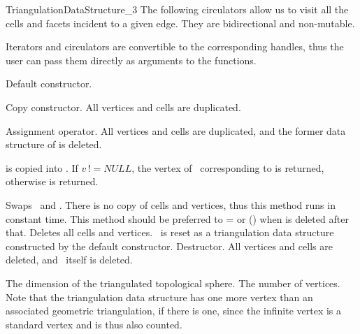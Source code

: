 \begin{ccRefConcept}{TriangulationDataStructure_3}
The following circulators allow us to visit all the cells and facets
incident to a given edge. They are bidirectional and non-mutable.

\ccGlue
{}

Iterators and circulators are convertible to the corresponding handles, thus
the user can pass them directly as arguments to the functions.

\ccCreation
{}  %
\ccThreeToTwo

{Default constructor.}

{Copy constructor. All vertices and cells are duplicated.}

{Assignment operator. All vertices and cells are duplicated, and the former
data structure of  is deleted.}


{ is copied into \ccVar. If $v\, !\!= NULL$, the vertex of \ccVar\ 
corresponding to  is returned, otherwise  is returned.
\ccPrecond{The optional argument \ccc{v} is a vertex of .}}

{Swaps \ccVar\ and . There is no copy of cells and vertices,
thus this method runs in constant time. This method should be preferred to
\ccVar= or \ccVar(\ccc{tds1}) when \ccc{tds1} is deleted after
that.}
\ccGlue
{}
{Deletes all cells and vertices. \ccVar\ is reset as a triangulation
data structure constructed by the default constructor.}
\ccGlue
{}
{Destructor. All vertices and cells are deleted, and \ccVar\ itself is
deleted.} 

\ccOperations

\ccAccessFunctions
{}

{The dimension of the triangulated topological sphere.}
\ccGlue
{}
{The number of vertices. Note that the triangulation data structure has one
more vertex than an associated geometric triangulation, if there is
one, since the infinite vertex is a standard vertex and is thus also
counted.} 


\end{ccRefConcept}
